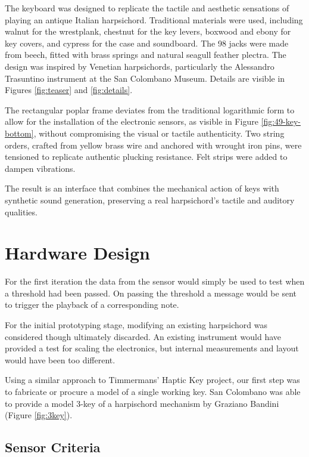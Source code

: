 The keyboard was designed to replicate the tactile and aesthetic sensations of playing an antique Italian harpsichord. Traditional materials were used, including walnut for the wrestplank, chestnut for the key levers, boxwood and ebony for key covers, and cypress for the case and soundboard. The 98 jacks were made from beech, fitted with brass springs and natural seagull feather plectra. The design was inspired by Venetian harpsichords, particularly the Alessandro Trasuntino instrument at the San Colombano Museum. Details are visible in Figures \ref{fig:teaser} and \ref{fig:details}.

The rectangular poplar frame deviates from the traditional logarithmic form to allow for the installation of the electronic sensors, as visible in Figure \ref{fig:49-key-bottom}, without compromising the visual or tactile authenticity. Two string orders, crafted from yellow brass wire and anchored with wrought iron pins, were tensioned to replicate authentic plucking resistance. Felt strips were added to dampen vibrations.

The result is an interface that combines the mechanical action of keys with synthetic sound generation, preserving a real harpsichord's tactile and auditory qualities.



\section{Hardware Design}

For the first iteration the data from the sensor would simply be used to test when a threshold had been passed. On passing the threshold a message would be sent to trigger the playback of a corresponding note.

For the initial prototyping stage, modifying an existing harpsichord was considered though ultimately discarded. An existing instrument would
have provided a test for scaling the electronics, but internal measurements and layout would have been too different. 

Using a similar approach to Timmermans' Haptic Key project, \cite{Timmermans2020} our first step was to fabricate or procure a model of a single working key. San Colombano was able to provide a model 3-key of a harpischord mechanism by Graziano Bandini (Figure \ref{fig:3key}).

\subsection{Sensor Criteria}\label{sensor-criteria}

